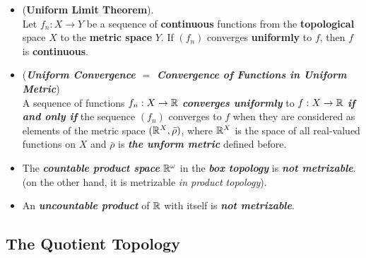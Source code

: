 \documentclass[11pt]{article}
\begin{document}
\begin{itemize}
\item \begin{theorem} (\textbf{Uniform Limit Theorem}). \citep{munkres2000topology}\\
Let $f_n : X \rightarrow Y$ be a sequence of  \textbf{continuous} functions from the \textbf{topological} space $X$ to the \textbf{metric space} $Y$. If $(f_n)$ converges
\textbf{uniformly} to $f$, then $f$ is \textbf{continuous}.
\end{theorem}

\item \begin{remark} (\emph{\textbf{Uniform Convergence $=$ Convergence of Functions in Uniform Metric}})\\
A sequence of functions $f_n : X \rightarrow {\mathbb R}$ \emph{\textbf{converges uniformly}} to $f: X \rightarrow {\mathbb R}$ \emph{\textbf{if and only if}} the sequence $(f_n)$ converges to $f$ when they are considered as elements of the metric space $({\mathbb R}^{X}, \bar{\rho})$, where ${\mathbb R}^{X}$ is the space of all real-valued functions on $X$ and $\bar{\rho}$ is \emph{\textbf{the unform metric}} defined before.
\end{remark}

\item \begin{example} 
The \emph{\textbf{countable product space}} ${\mathbb R}^{\omega}$ in the \emph{\textbf{box topology}} is \emph{\textbf{not metrizable}}. (on the other hand,  it is metrizable \emph{in product topology}).
\end{example}

\item \begin{example}
An \emph{\textbf{uncountable product}} of ${\mathbb R}$ with itself is \emph{\textbf{not metrizable}}.
\end{example}
\end{itemize}

\subsection{The Quotient Topology}
\end{document}
